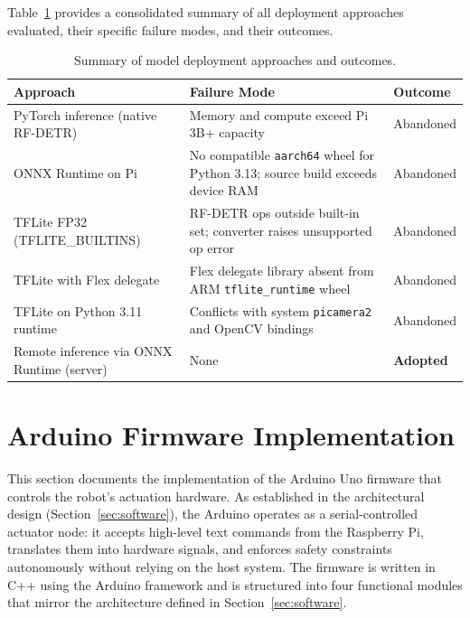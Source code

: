 Table~\ref{tab:deployment_stages} provides a consolidated summary of
all deployment approaches evaluated, their specific failure modes,
and their outcomes.

\begin{table}[h]
\centering
\caption{Summary of model deployment approaches and outcomes.}
\label{tab:deployment_stages}
\begin{tabular}{p{3.2cm} p{4.2cm} p{4.2cm}}
\hline
\textbf{Approach} & \textbf{Failure Mode} & \textbf{Outcome} \\
\hline
PyTorch inference (native RF-DETR) &
    Memory and compute exceed Pi 3B+ capacity &
    Abandoned \\
ONNX Runtime on Pi &
    No compatible \texttt{aarch64} wheel for Python 3.13; source build exceeds device RAM &
    Abandoned \\
TFLite FP32 (TFLITE\_BUILTINS) &
    RF-DETR ops outside built-in set; converter raises unsupported op error &
    Abandoned \\
TFLite with Flex delegate &
    Flex delegate library absent from ARM \texttt{tflite\_runtime} wheel &
    Abandoned \\
TFLite on Python 3.11 runtime &
    Conflicts with system \texttt{picamera2} and OpenCV bindings &
    Abandoned \\
Remote inference via ONNX Runtime (server) &
    None &
    \textbf{Adopted} \\
\hline
\end{tabular}
\end{table}


\section{Arduino Firmware Implementation}
\label{sec:arduino_firmware}

This section documents the implementation of the Arduino Uno firmware
that controls the robot's actuation hardware. As established in the
architectural design (Section~\ref{sec:software}), the Arduino operates
as a serial-controlled actuator node: it accepts high-level text
commands from the Raspberry Pi, translates them into hardware signals,
and enforces safety constraints autonomously without relying on the
host system. The firmware is written in C++ using the Arduino framework
and is structured into four functional modules that mirror the
architecture defined in Section~\ref{sec:software}.

